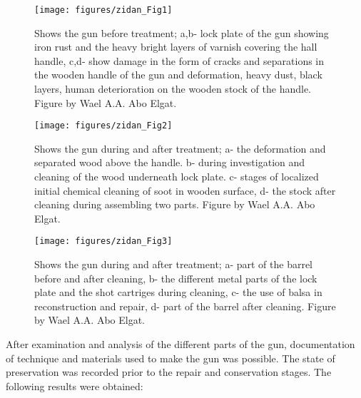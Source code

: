 \begin{figure}[!htb]
	\texttt{[image: figures/zidan\_Fig1]}
	\caption{Shows the gun before treatment; a,b- lock plate of the gun showing iron rust and the heavy bright layers of varnish covering the hall handle, c,d- show damage in the form of cracks and separations in the wooden handle of the gun and deformation, heavy dust, black layers, human deterioration on the wooden stock of the handle. Figure by Wael A.A. Abo Elgat.}
	\label{fig:Fig1}
\end{figure}
\begin{figure}[!htb]
	\texttt{[image: figures/zidan\_Fig2]}
	\caption{Shows the gun during and after treatment; a- the deformation and separated wood above the handle. b- during investigation and cleaning of the wood underneath lock plate. c- stages of localized initial chemical cleaning of soot in wooden surface, d- the stock after cleaning during assembling two parts. Figure by Wael A.A. Abo Elgat.}
	\label{fig:Fig2}
\end{figure}
\begin{figure}[!htb]
	\texttt{[image: figures/zidan\_Fig3]}
	\caption{Shows the gun during and after treatment; a- part of the barrel before and after cleaning, b- the different metal parts of the lock plate and the shot cartriges during cleaning, c- the use of balsa in reconstruction and repair, d- part of the barrel after cleaning. Figure by Wael A.A. Abo Elgat.}
	\label{fig:Fig3}
\end{figure}
\noindent After examination and analysis of the different parts of the gun, documentation of technique and materials used to make the gun was possible. The state of preservation was recorded prior to the repair and conservation stages. The following results were obtained: 

